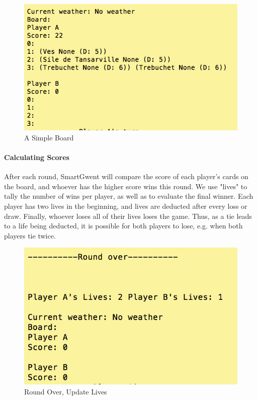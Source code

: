 \documentclass[numbers]{sigplanconf}
\begin{document}
\begin{figure}
  \includegraphics[width=\linewidth]{simpleGameBoard.png}
  \caption{A Simple Board}
  \label{fig:simpleBoard}
\end{figure}

\paragraph{Calculating Scores} 
After each round, SmartGwent will compare the score of each player's cards on the board, and whoever has the higher score wins this round. We use "lives" to tally the number of wins per player, as well as to evaluate the final winner. Each player has two lives in the beginning, and lives are deducted after every loss or draw. Finally, whoever loses all of their lives loses the game. Thus, as a tie leads to a life being deducted, it is possible for both players to lose, e.g. when both players tie twice.

\begin{figure}
  \includegraphics[width=\linewidth]{roundover.png}
  \caption{Round Over, Update Lives}
  \label{fig:roundOver}
\end{figure}
\end{document}
